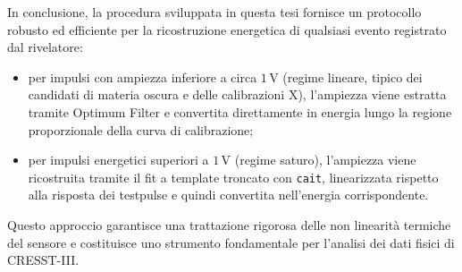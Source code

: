 In conclusione, la procedura sviluppata in questa tesi fornisce un protocollo robusto ed efficiente per la ricostruzione energetica di qualsiasi evento registrato dal rivelatore:
\begin{itemize}
    \item per impulsi con ampiezza inferiore a circa $1\,\text{V}$ (regime lineare, tipico dei candidati di materia oscura e delle calibrazioni X), l'ampiezza viene estratta tramite Optimum Filter e convertita direttamente in energia lungo la regione proporzionale della curva di calibrazione;
    \item per impulsi energetici superiori a $1\,\text{V}$ (regime saturo), l'ampiezza viene ricostruita tramite il fit a template troncato con \texttt{cait}, linearizzata rispetto alla risposta dei testpulse e quindi convertita nell'energia corrispondente.
\end{itemize}
Questo approccio garantisce una trattazione rigorosa delle non linearità termiche del sensore e costituisce uno strumento fondamentale per l'analisi dei dati fisici di CRESST-III.